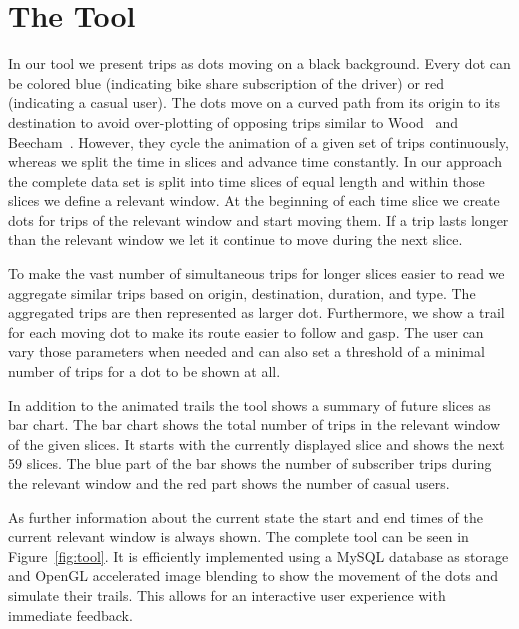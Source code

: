 \section{The Tool}
\label{sec:impl}
In our tool we present trips as dots moving on a black background.
Every dot can be colored blue (indicating bike share subscription of the driver)
or red (indicating a casual user). The dots move on a curved path from
its origin to its destination to avoid over-plotting of opposing trips
similar to Wood~\etal\cite{Wood2011} and
Beecham~\etal\cite{Beecham2012}.
However, they cycle the animation of a given set of trips continuously,
whereas we split the time in slices and advance time constantly.
In our approach the complete data set is split into time slices of equal
length and within those slices we define a relevant window.
At the beginning of each time slice we create dots for trips of the
relevant window and start moving them. If a trip lasts longer than the
relevant window we let it continue to move during the next slice.

To make the vast number of simultaneous trips for longer slices
easier to read we aggregate similar trips based on origin, destination,
duration, and type. The aggregated trips are then represented as larger
dot.
Furthermore, we show a trail for each moving dot to make its
route easier to follow and gasp.
The user can vary those parameters when needed and can also
set a threshold of a minimal number of trips for a dot to be shown at all.

In addition to the animated trails the tool shows a summary of
future slices as bar chart.
The bar chart shows the total number of trips in the relevant window
of the given slices.
It starts with the currently displayed slice and shows the next 59 slices.
The blue part of the bar shows the number of subscriber trips during
the relevant window and the red part shows the number of casual users.

As further information about the current state the start and end times
of the current relevant window is always shown.
The complete tool can be seen in Figure~\ref{fig:tool}.
It is efficiently implemented using a MySQL database as storage and
OpenGL accelerated image blending to show the movement of the dots
and simulate their trails.
This allows for an interactive user experience with immediate feedback.
